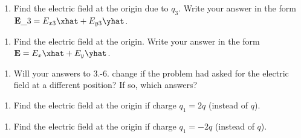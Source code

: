 \begin{enumerate}
\def\labelenumi{\arabic{enumi}.}
\setcounter{enumi}{4}
\tightlist
\item
  Find the electric field at the origin due to \(q_3\). Write your
  answer in the form \(\mathbf{E}\_3=E_{x3}\xhat + E_{y3}\yhat\).
\end{enumerate}

\begin{enumerate}
\def\labelenumi{\arabic{enumi}.}
\setcounter{enumi}{5}
\tightlist
\item
  Find the electric field at the origin. Write your answer in the form
  \(\mathbf{E}=E_{x}\xhat + E_{y}\yhat\).
\end{enumerate}

\begin{enumerate}
\def\labelenumi{\arabic{enumi}.}
\setcounter{enumi}{6}
\tightlist
\item
  Will your answers to 3.-6. change if the problem had asked for the
  electric field at a different position? If so, which answers?
\end{enumerate}

\newpage

\begin{enumerate}
\def\labelenumi{\arabic{enumi}.}
\setcounter{enumi}{7}
\tightlist
\item
  Find the electric field at the origin if charge \(q_1=2q\) (instead of
  \(q\)).
\end{enumerate}

\begin{enumerate}
\def\labelenumi{\arabic{enumi}.}
\setcounter{enumi}{8}
\tightlist
\item
  Find the electric field at the origin if charge \(q_1=-2q\) (instead
  of \(q\)).
\end{enumerate}
